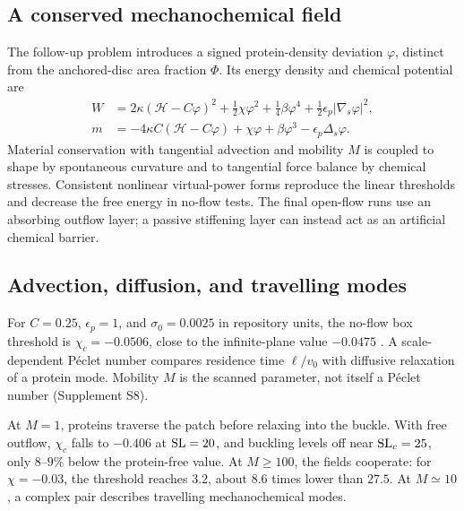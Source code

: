 \subsection{A conserved mechanochemical field}
The follow-up problem introduces a signed protein-density deviation $\varphi$, distinct from the anchored-disc area fraction $\Phi$. Its energy density and chemical potential are
\begin{align}
W&=2\kappa(\mathcal H-C\varphi)^2+\tfrac12\chi\varphi^2+\tfrac14\beta\varphi^4+\tfrac12\epsilon_p|\nabla_s\varphi|^2,\label{eq:proteinenergy}\\
m&=-4\kappa C(\mathcal H-C\varphi)+\chi\varphi+\beta\varphi^3-\epsilon_p\Delta_s\varphi.\nonumber
\end{align}
Material conservation with tangential advection and mobility $M$ is coupled to shape by spontaneous curvature and to tangential force balance by chemical stresses. Consistent nonlinear virtual-power forms reproduce the linear thresholds and decrease the free energy in no-flow tests. The final open-flow runs use an absorbing outflow layer; a passive stiffening layer can instead act as an artificial chemical barrier.


\subsection{Advection, diffusion, and travelling modes}
For $C=0.25$, $\epsilon_p=1$, and $\sigma_0=0.0025$ in repository units, the no-flow box threshold is $\chi_c=-0.0506$, close to the infinite-plane value $-0.0475$ \cite{leibler}. A scale-dependent P\'eclet number compares residence time $\ell/v_0$ with diffusive relaxation of a protein mode. Mobility $M$ is the scanned parameter, not itself a P\'eclet number (Supplement S8).

At $M=1$, proteins traverse the patch before relaxing into the buckle. With free outflow, $\chi_c$ falls to $-0.406$ at $\mathrm{SL}=20$, and buckling levels off near $\mathrm{SL}_c=25$, only $8$--$9\%$ below the protein-free value. At $M\geq100$, the fields cooperate: for $\chi=-0.03$, the threshold reaches $3.2$, about $8.6$ times lower than $27.5$. At $M\simeq10$, a complex pair describes travelling mechanochemical modes.

